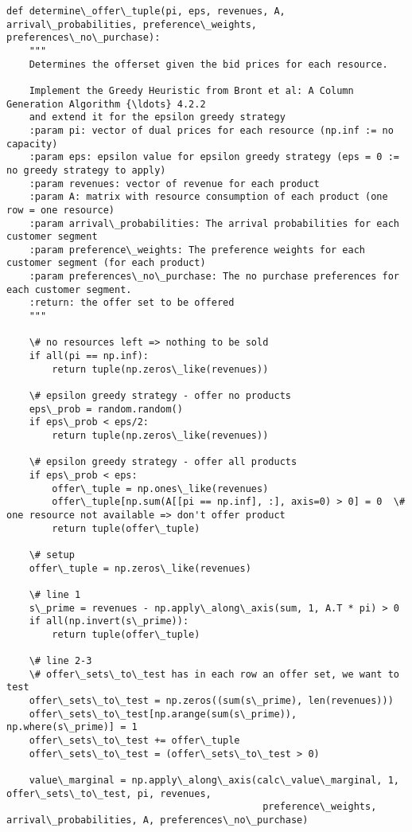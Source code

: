 \documentclass[11pt]{article}
\begin{document}
    \begin{Verbatim}[commandchars=\\\{\}]
def determine\_offer\_tuple(pi, eps, revenues, A, arrival\_probabilities, preference\_weights, preferences\_no\_purchase):
    """
    Determines the offerset given the bid prices for each resource.

    Implement the Greedy Heuristic from Bront et al: A Column Generation Algorithm {\ldots} 4.2.2
    and extend it for the epsilon greedy strategy
    :param pi: vector of dual prices for each resource (np.inf := no capacity)
    :param eps: epsilon value for epsilon greedy strategy (eps = 0 := no greedy strategy to apply)
    :param revenues: vector of revenue for each product
    :param A: matrix with resource consumption of each product (one row = one resource)
    :param arrival\_probabilities: The arrival probabilities for each customer segment
    :param preference\_weights: The preference weights for each customer segment (for each product)
    :param preferences\_no\_purchase: The no purchase preferences for each customer segment.
    :return: the offer set to be offered
    """

    \# no resources left => nothing to be sold
    if all(pi == np.inf):
        return tuple(np.zeros\_like(revenues))

    \# epsilon greedy strategy - offer no products
    eps\_prob = random.random()
    if eps\_prob < eps/2:
        return tuple(np.zeros\_like(revenues))

    \# epsilon greedy strategy - offer all products
    if eps\_prob < eps:
        offer\_tuple = np.ones\_like(revenues)
        offer\_tuple[np.sum(A[[pi == np.inf], :], axis=0) > 0] = 0  \# one resource not available => don't offer product
        return tuple(offer\_tuple)

    \# setup
    offer\_tuple = np.zeros\_like(revenues)

    \# line 1
    s\_prime = revenues - np.apply\_along\_axis(sum, 1, A.T * pi) > 0
    if all(np.invert(s\_prime)):
        return tuple(offer\_tuple)

    \# line 2-3
    \# offer\_sets\_to\_test has in each row an offer set, we want to test
    offer\_sets\_to\_test = np.zeros((sum(s\_prime), len(revenues)))
    offer\_sets\_to\_test[np.arange(sum(s\_prime)), np.where(s\_prime)] = 1
    offer\_sets\_to\_test += offer\_tuple
    offer\_sets\_to\_test = (offer\_sets\_to\_test > 0)

    value\_marginal = np.apply\_along\_axis(calc\_value\_marginal, 1, offer\_sets\_to\_test, pi, revenues,
                                             preference\_weights, arrival\_probabilities, A, preferences\_no\_purchase)


\end{Verbatim}
\end{document}

